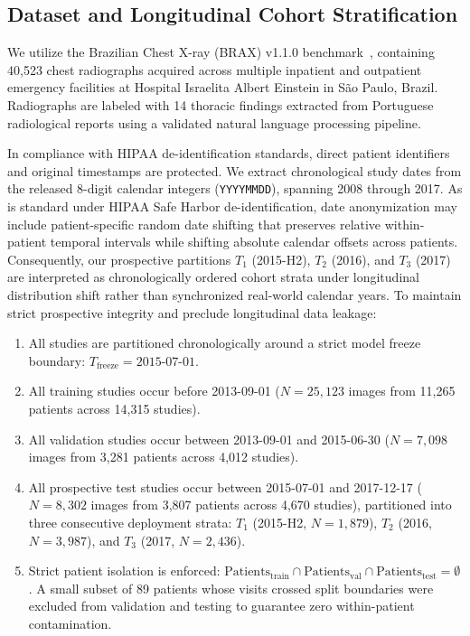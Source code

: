 \documentclass[journal]{IEEEtran}
\begin{document}
\subsection{Dataset and Longitudinal Cohort Stratification}
We utilize the Brazilian Chest X-ray (BRAX) v1.1.0 benchmark~\cite{reis2022brax}, containing 40,523 chest radiographs acquired across multiple inpatient and outpatient emergency facilities at Hospital Israelita Albert Einstein in S\~ao Paulo, Brazil. Radiographs are labeled with 14 thoracic findings extracted from Portuguese radiological reports using a validated natural language processing pipeline.

In compliance with HIPAA de-identification standards, direct patient identifiers and original timestamps are protected. We extract chronological study dates from the released 8-digit calendar integers (\texttt{YYYYMMDD}), spanning 2008 through 2017. As is standard under HIPAA Safe Harbor de-identification, date anonymization may include patient-specific random date shifting that preserves relative within-patient temporal intervals while shifting absolute calendar offsets across patients. Consequently, our prospective partitions $T_1$ (2015-H2), $T_2$ (2016), and $T_3$ (2017) are interpreted as chronologically ordered cohort strata under longitudinal distribution shift rather than synchronized real-world calendar years. To maintain strict prospective integrity and preclude longitudinal data leakage:
\begin{enumerate}
    \item All studies are partitioned chronologically around a strict model freeze boundary: $T_{\text{freeze}} = \text{2015-07-01}$.
    \item All training studies occur before 2013-09-01 ($N = 25,123$ images from 11,265 patients across 14,315 studies).
    \item All validation studies occur between 2013-09-01 and 2015-06-30 ($N = 7,098$ images from 3,281 patients across 4,012 studies).
    \item All prospective test studies occur between 2015-07-01 and 2017-12-17 ($N = 8,302$ images from 3,807 patients across 4,670 studies), partitioned into three consecutive deployment strata: $T_1$ (2015-H2, $N=1,879$), $T_2$ (2016, $N=3,987$), and $T_3$ (2017, $N=2,436$).
    \item Strict patient isolation is enforced: $\text{Patients}_{\text{train}} \cap \text{Patients}_{\text{val}} \cap \text{Patients}_{\text{test}} = \emptyset$. A small subset of 89 patients whose visits crossed split boundaries were excluded from validation and testing to guarantee zero within-patient contamination.
\end{enumerate}
\end{document}

